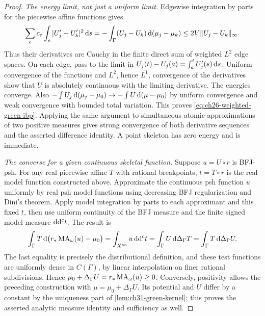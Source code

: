 \begin{proof}
\emph{The energy limit, not just a uniform limit.}
Edgewise integration by parts for the piecewise affine functions gives
\[
 \sum_e c_e\int_e|U_j'-U_k'|^2\,\mathrm d s
 =-\int_\Gamma(U_j-U_k)\,\mathrm d(\mu_j-\mu_k)
 \leq 2V\lVert U_j-U_k\rVert_\infty.
\]
Thus their derivatives are Cauchy in the finite direct sum of weighted
\(L^2\) edge spaces.  On each edge, pass to the limit in
\(U_j(t)-U_j(a)=\int_a^tU_j'(s)\,\mathrm d s\).  Uniform convergence of the
functions and \(L^2\), hence \(L^1\), convergence of the derivatives
show that \(U\) is absolutely continuous with the limiting derivative.
The energies converge.  Also
\(-\int U_j\,\mathrm d(\mu_j-\mu_0)\to-\int U\,\mathrm d(\mu-\mu_0)\)
by uniform convergence and weak convergence with bounded total variation.
This proves \eqref{eq:ch26-weighted-green-ibp}.  Applying the same argument
to simultaneous atomic approximations of two positive measures gives
strong convergence of both derivative sequences and the asserted
difference identity.  A point skeleton has zero energy and is immediate.

\emph{The converse for a given continuous skeletal function.}
Suppose \(u=U\circ r\) is BFJ-psh.  For any real piecewise affine
\(T\) with rational breakpoints, \(t=T\circ r\) is the real model
function constructed above.  Approximate the continuous psh function
\(u\) uniformly by real psh model functions using decreasing BFJ
regularization and Dini's theorem.  Apply model integration by parts to
each approximant and this fixed \(t\), then use uniform continuity of
the BFJ measure and the finite signed model measure \(\mathrm d\mathrm d^c t\).  The
result is
\[
 \int_\Gamma T\,\mathrm d\bigl(r_*\operatorname{MA}_\omega(u)-\mu_0\bigr)
 =\int_{X^{\mathrm{an}}}u\,\mathrm d\mathrm d^c t
 =\int_\Gamma U\,\mathrm d\Delta_\Gamma T
 =\int_\Gamma T\,\mathrm d\Delta_\Gamma U.
\]
The last equality is precisely the distributional definition, and these
test functions are uniformly dense in \(C(\Gamma)\), by linear
interpolation on finer rational subdivisions.  Hence
\(\mu_0+\Delta_\Gamma U=r_*\operatorname{MA}_\omega(u)\geq0\).
Conversely, positivity allows the preceding construction with
\(\mu=\mu_0+\Delta_\Gamma U\).  Its potential and \(U\) differ by
a constant by the uniqueness part of \cref{lem:ch31-green-kernel}; this
proves the asserted analytic measure identity and sufficiency as well.
\end{proof}

